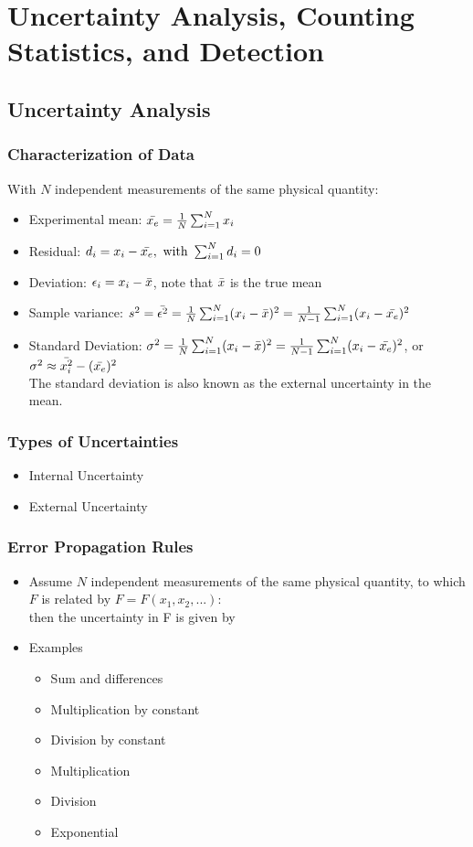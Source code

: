 \section{Uncertainty Analysis, Counting Statistics, and Detection}
\subsection{Uncertainty Analysis}
\subsubsection{Characterization of Data}
With $N$ independent measurements of the same physical quantity:
\begin{itemize}
    \item Experimental mean: $\Bar{x_e}=\frac{1}{N}\sum_{i=1}^Nx_i$
    \item Residual: $d_i=x_i-\Bar{x_e},\text{ with }\sum_{i=1}^Nd_i=0$
    \item Deviation: $\epsilon_i=x_i-\Bar{x}$, note that $\Bar{x}$ is the true mean 
    \item Sample variance: $s^2=\Bar{\epsilon^2}=\frac{1}{N}\sum_{i=1}^N(x_i-\Bar{x})^2=\frac{1}{N-1}\sum_{i=1}^N(x_i-\Bar{x_e})^2$
    \item Standard Deviation: $\sigma^2=\frac{1}{N}\sum_{i=1}^N(x_i-\Bar{x})^2=\frac{1}{N-1}\sum_{i=1}^N(x_i-\Bar{x_e})^2$, or $\sigma^2\approx\Bar{x_i^2}-(\Bar{x_e})^2$\\
    The standard deviation is also known as the external uncertainty in the mean.
\end{itemize}
\subsubsection{Types of Uncertainties}
\begin{itemize}
    \item Internal Uncertainty
    \item External Uncertainty
\end{itemize}
\subsubsection{Error Propagation Rules}
\begin{itemize}
    \item Assume $N$ independent measurements of the same physical quantity, to which $F$ is related by $F=F(x_1,x_2,...)$:\\
    then the uncertainty in F is given by 
    \item Examples
    \begin{itemize}
        \item Sum and differences
        \item Multiplication by constant
        \item Division by constant
        \item Multiplication 
        \item Division
        \item Exponential
    \end{itemize}
\end{itemize}

